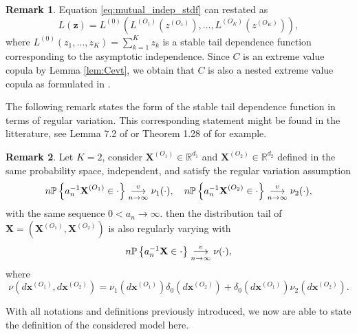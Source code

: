 \documentclass[11pt]{article}
\theoremstyle{definition}
\newtheorem{remark}{Remark}
\begin{document}
	\begin{remark}
		Equation \eqref{eq:mutual_indep_stdf} can restated as 
		\begin{equation*}
			L(\textbf{z}) = L^{(0)} \left(L^{(O_1)}\left(z^{(O_1)}\right), \dots, L^{(O_K)}\left(z^{(O_K)}\right) \right),
		\end{equation*}
		where $L^{(0)}(z_1, \dots, z_K) = \sum_{k=1}^K z_k$ is a stable tail dependence function corresponding to the asymptotic independence. Since $C$ is an extreme value copula by Lemma \ref{lem:Cevt}, we obtain that $C$ is also a nested extreme value copula as formulated in \cite{hofert2018hierarchical}.
	\end{remark}
	The following remark states the form of the stable tail dependence function in terms of regular variation. This corresponding statement might be found in the litterature, see Lemma 7.2 of \cite{resnick2007heavy} or Theorem 1.28 of \cite{lindskog2004multivariate} for example.	
	\begin{remark}
		Let $K = 2$, consider $\textbf{X}^{(O_1)} \in \mathbb{R}^{d_1}$ and $\textbf{X}^{(O_2)} \in \mathbb{R}^{d_2}$ defined in the same probability space, independent, and satisfy the regular variation assumption
		\begin{equation*}
			n \mathbb{P}\left\{ a_n^{-1} \textbf{X}^{(O_1)} \in \cdot \right\} \overunderset{v}{n \rightarrow \infty}{\longrightarrow} \nu_1(\cdot), \quad n \mathbb{P}\left\{ a_n^{-1} \textbf{X}^{(O_2)} \in \cdot \right\} \overunderset{v}{n \rightarrow \infty}{\longrightarrow} \nu_2(\cdot),
		\end{equation*}
		with the same sequence $0< a_n \rightarrow \infty$. then the distribution tail of $\textbf{X} = (\textbf{X}^{(O_1)}, \textbf{X}^{(O_2)})$ is also regularly varying with 
		\begin{equation*}
			n \mathbb{P}\left\{ a_n^{-1} \textbf{X} \in \cdot \right\} \overunderset{v}{n \rightarrow \infty}{\longrightarrow} \nu(\cdot),
		\end{equation*}
		where
		\begin{equation*}
			\nu(d\textbf{x}^{(O_1)}, d\textbf{x}^{(O_2)}) = \nu_1 (d\textbf{x}^{(O_1)}) \delta_0(d\textbf{x}^{(O_2)}) + \delta_0(d\textbf{x}^{(O_1)}) \nu_2(d\textbf{x}^{(O_2)}).
		\end{equation*}
	\end{remark}
	
	With all notations and definitions previously introduced, we now are able to state the definition of the considered model here.
	
\end{document}
